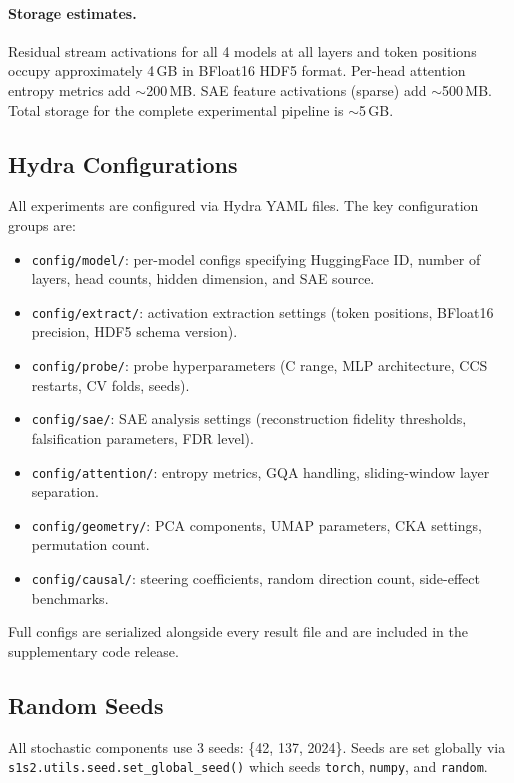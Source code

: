 \paragraph{Storage estimates.}
Residual stream activations for all 4 models at all layers and token
positions occupy approximately 4\,GB in BFloat16 HDF5 format.  Per-head
attention entropy metrics add $\sim$200\,MB.  SAE feature activations
(sparse) add $\sim$500\,MB.  Total storage for the complete experimental
pipeline is $\sim$5\,GB.

\subsection{Hydra Configurations}

All experiments are configured via Hydra YAML files.  The key configuration
groups are:
\begin{itemize}[leftmargin=*,itemsep=1pt]
  \item \texttt{config/model/}: per-model configs specifying HuggingFace
  ID, number of layers, head counts, hidden dimension, and SAE source.
  \item \texttt{config/extract/}: activation extraction settings (token
  positions, BFloat16 precision, HDF5 schema version).
  \item \texttt{config/probe/}: probe hyperparameters (C range, MLP
  architecture, CCS restarts, CV folds, seeds).
  \item \texttt{config/sae/}: SAE analysis settings (reconstruction
  fidelity thresholds, falsification parameters, FDR level).
  \item \texttt{config/attention/}: entropy metrics, GQA handling,
  sliding-window layer separation.
  \item \texttt{config/geometry/}: PCA components, UMAP parameters,
  CKA settings, permutation count.
  \item \texttt{config/causal/}: steering coefficients, random direction
  count, side-effect benchmarks.
\end{itemize}
Full configs are serialized alongside every result file and are included
in the supplementary code release.

\subsection{Random Seeds}

All stochastic components use 3 seeds: \{42, 137, 2024\}.  Seeds are set
globally via \texttt{s1s2.utils.seed.set\_global\_seed()} which seeds
\texttt{torch}, \texttt{numpy}, and \texttt{random}.

